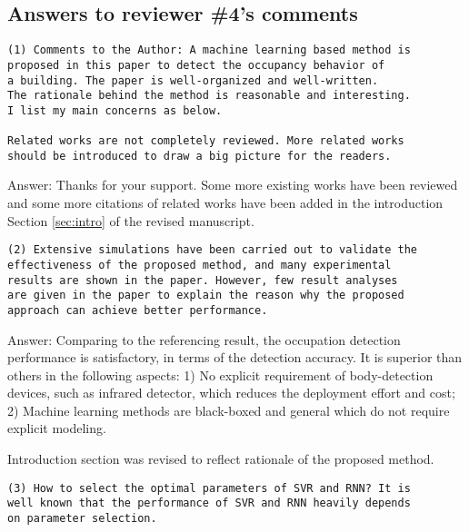 \subsection{Answers to reviewer \#4's comments}
\begin{verbatim}
(1) Comments to the Author: A machine learning based method is
proposed in this paper to detect the occupancy behavior of
a building. The paper is well-organized and well-written.
The rationale behind the method is reasonable and interesting.
I list my main concerns as below.

Related works are not completely reviewed. More related works
should be introduced to draw a big picture for the readers.
\end{verbatim}

Answer: Thanks for your support. Some more existing works have been reviewed
and some more citations of related works have been added in the introduction
Section \ref{sec:intro} of the revised manuscript.



\begin{verbatim}
(2) Extensive simulations have been carried out to validate the
effectiveness of the proposed method, and many experimental
results are shown in the paper. However, few result analyses
are given in the paper to explain the reason why the proposed
approach can achieve better performance.
\end{verbatim}

Answer: Comparing to the referencing result, the occupation detection
performance is satisfactory, in terms of the detection accuracy. It is
superior than others in the following aspects: 1) No explicit
requirement of body-detection devices, such as infrared detector,
which reduces the deployment effort and cost; 2) Machine learning
methods are black-boxed and general which do not require explicit
modeling.

Introduction section was revised to reflect rationale of the
proposed method.

\begin{verbatim}
(3) How to select the optimal parameters of SVR and RNN? It is
well known that the performance of SVR and RNN heavily depends
on parameter selection.
\end{verbatim}

